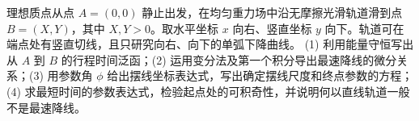 理想质点从点 \(A=(0,0)\) 静止出发，在均匀重力场中沿无摩擦光滑轨道滑到点 \(B=(X,Y)\)，其中 \(X,Y>0\)。取水平坐标 \(x\) 向右、竖直坐标 \(y\) 向下。轨道可在端点处有竖直切线，且只研究向右、向下的单弧下降曲线。
(1) 利用能量守恒写出从 \(A\) 到 \(B\) 的行程时间泛函；(2) 运用变分法及第一个积分导出最速降线的微分关系；(3) 用参数角 \(\phi\) 给出摆线坐标表达式，写出确定摆线尺度和终点参数的方程；(4) 求最短时间的参数表达式，检验起点处的可积奇性，并说明何以直线轨道一般不是最速降线。
